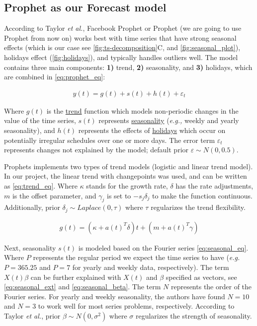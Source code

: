 \subsection[Prophet as our Forecast model]{Prophet as our Forecast model}
\label{sec:forecast_model}

According to Taylor \textit{et al.}\autocite{taylor2018forecasting}, Facebook Prophet or Prophet (we are going to use Prophet from now on)  works best with time series that have strong seasonal effects (which is our case see \autoref{fig:ts-decomposition}C, and \autoref{fig:seasonal_plot}), holidays effect (\autoref{fig:holidays}), and typically handles outliers well. The model contains three main components: \textbf{1)} trend, \textbf{2)} seasonality, and \textbf{3)} holidays, which are combined in \autoref{eq:prophet_eq}:

\begin{align}\label{eq:prophet_eq}
y(t)= g(t) + s(t) + h(t) + \varepsilon_t  
\end{align}

Where $g(t)$ is the \underline{trend} function which models non-periodic changes in the value of the time series, $s(t)$ represents \underline{seasonality} (\textit{e.g.,} weekly and yearly seasonality), and $h(t)$ represents the effects of \underline{holidays} which occur on potentially irregular schedules over one or more days. The error term $\varepsilon_t$ represents changes not explained by the model; default prior $\varepsilon \sim N(0,0.5)$.

Prophets implements two types of trend models (logistic and linear trend model). In our project, the linear trend with changepoints was used, and can be written as \autoref{eq:trend_eq}. Where $\kappa$ stands for the growth rate, $\delta$ has the rate adjustments, $m$ is the offset parameter, and $\gamma_j$ is set to $-s_j\delta_j$ to make the function continuous. Additionally, prior $\delta_j \sim Laplace(0,\tau)$  where $\tau$ regularizes the trend flexibility.  

\begin{align}\label{eq:trend_eq}
g(t)= (\kappa + a(t)^T\delta)t + (m + a(t)^T\gamma)
\end{align}  

Next, seasonality $s(t)$ is modeled based on the Fourier series \autoref{eq:seasonal_eq}. Where $P$ represents the regular period we expect the time series to have (\textit{e.g.} $P=365.25$ and $P=7$ for yearly and weekly data, respectively). The term $X(t)\beta$ can be further explained with $X(t)$ and $\beta$ specified as vectors, see \autoref{eq:seasonal_ext} and \autoref{eq:seasonal_beta}. The term $N$ represents the order of the Fourier series. For yearly and weekly seasonality, the authors have found $N = 10$ and $N = 3$ to work well for most series problems, respectively. According to Taylor \textit{et al.}, prior $\beta \sim N(0,\sigma^2)$ where $\sigma$ regularizes the strength of seasonality.

